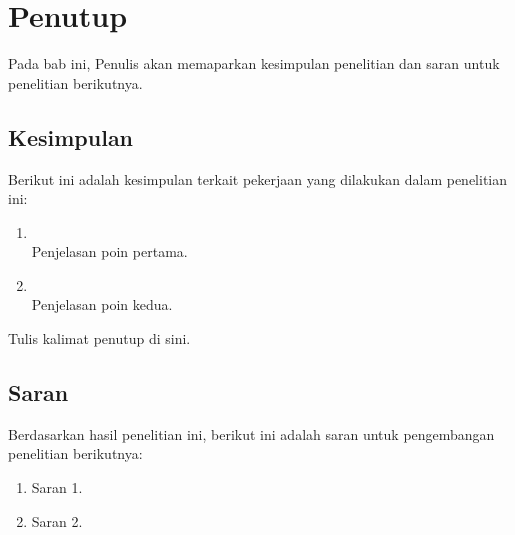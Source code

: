 \chapter{Penutup}\label{bab:6}
Pada bab ini, Penulis akan memaparkan kesimpulan penelitian dan saran untuk penelitian berikutnya.


\section{Kesimpulan}\label{sec:kesimpulan}
Berikut ini adalah kesimpulan terkait pekerjaan yang dilakukan dalam penelitian ini:
\begin{enumerate}
	\item {} \\
	      Penjelasan poin pertama.
	\item {} \\
	      Penjelasan poin kedua.
\end{enumerate}

Tulis kalimat penutup di sini.


\section{Saran}\label{sec:saran}
Berdasarkan hasil penelitian ini, berikut ini adalah saran untuk pengembangan penelitian berikutnya:
\begin{enumerate}
	\item Saran 1.
	\item Saran 2.
\end{enumerate}
